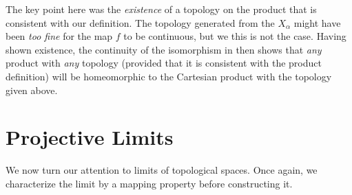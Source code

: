      \begin{rmk}
        The key point here was the \emph{existence} of a topology on the product that is consistent with our definition. 
        The topology generated from the $X_\alpha$ might have been \emph{too fine} for the map $f$ to be continuous, but we this is not the case.
        Having shown existence, the continuity of the isomorphism in  then shows that \emph{any} product with \emph{any}  topology (provided that it is consistent with the product definition) will be homeomorphic to the Cartesian product with the topology given above.
      \end{rmk}

    \section{Projective Limits}
      We now turn our attention to limits of topological spaces.
      Once again, we characterize the limit by a mapping property before constructing it.
